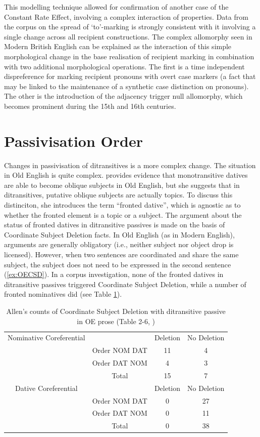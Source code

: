 	This modelling technique allowed for confirmation of another case of the Constant Rate Effect, involving a complex interaction of properties. Data from the corpus on the spread of `to'-marking is strongly consistent with it involving a single change across all recipient constructions. The complex allomorphy seen in Modern British English can be explained as the interaction of this simple morphological change in the base realisation of recipient marking in combination with two additional morphological operations. The first is a time independent dispreference for marking recipient pronouns with overt case markers (a fact that may be linked to the maintenance of a synthetic case distinction on pronouns). The other is the introduction of the adjacency trigger null allomorphy, which becomes prominent during the 15th and 16th centuries.

\section{Passivisation Order}
	Changes in passivisation of ditransitives is a more complex change. The situation in Old English is quite complex. \cite{Allen.1999} provides evidence that monotransitive datives are able to become oblique subjects in Old English, but she suggests that in ditransitives, putative oblique subjects are actually topics. To discuss this distinciton, she introduces the term ``fronted dative'', which is agnostic as to whether the fronted element is a topic or a subject. The argument about the status of fronted datives in ditransitive passives is made on the basis of Coordinate Subject Deletion facts.
	In Old English (as in Modern English), arguments are generally obligatory (i.e., neither subject nor object drop is licensed). However, when two sentences are coordinated and share the same subject, the subject does not need to be expressed in the second sentence (\ref{ex:OECSD}). In a corpus investigation, none of the fronted datives in ditransitive passives triggered Coordinate Subject Deletion, while a number of fronted nominatives did (see Table \ref{tab:AllenOECSD}). 

	\begin{table}
		\begin{tabular}{cccc}
			Nominative Coreferential & & Deletion & No Deletion \\
			& Order NOM DAT & 11 & 4 \\
			& Order DAT NOM & 4 & 3 \\
			& Total & 15 & 7 \\
			Dative Coreferential & & Deletion & No Deletion \\
			& Order NOM DAT & 0 & 27 \\
			& Order DAT NOM & 0 & 11 \\
			& Total & 0 & 38 \\
		\end{tabular}
		\caption{Allen's counts of Coordinate Subject Deletion with ditransitive passive in OE prose (Table 2-6, \citealt{Allen.1999})}
		\label{tab:AllenOECSD}
	\end{table}

